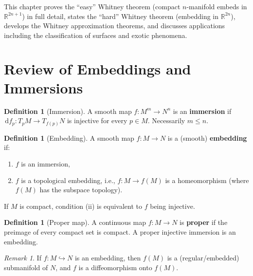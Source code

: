 \documentclass[12pt,a4paper,openany]{book}
\theoremstyle{definition}
\newtheorem{definition}[theorem]{Definition}
\theoremstyle{remark}
\newtheorem{remark}[theorem]{Remark}
\newcommand{\R}{\mathbb{R}}
\newcommand{\dd}{\,\mathrm{d}}
\begin{document}
This chapter proves the ``easy'' Whitney
theorem (compact $n$-manifold embeds in $\R^{2n+1}$) in full detail,
states the ``hard'' Whitney theorem (embedding in $\R^{2n}$),
develops the Whitney approximation theorems, and discusses applications
including the classification of surfaces and exotic phenomena.

\section{Review of Embeddings and Immersions}\label{sec:embed-review}

\begin{definition}[Immersion]\label{def:immersion-review}
A smooth map $f\colon M^m \to N^n$ is an \textbf{immersion} if
$\dd f_p\colon T_pM \to T_{f(p)}N$ is injective for every $p \in M$.
Necessarily $m \le n$.
\end{definition}

\begin{definition}[Embedding]\label{def:embedding-review}
A smooth map $f\colon M \to N$ is a (smooth) \textbf{embedding} if:
\begin{enumerate}[label=(\roman*)]
  \item $f$ is an immersion,
  \item $f$ is a topological embedding, i.e., $f\colon M \to f(M)$
    is a homeomorphism (where $f(M)$ has the subspace topology).
\end{enumerate}
If $M$ is compact, condition (ii) is equivalent to $f$ being injective.
\end{definition}

\begin{definition}[Proper map]\label{def:proper-review}
A continuous map $f\colon M \to N$ is \textbf{proper} if the preimage
of every compact set is compact. A proper injective immersion is an embedding.
\end{definition}

\begin{remark}\label{rem:embed-submanifold}
If $f\colon M \hookrightarrow N$ is an embedding, then $f(M)$ is a
(regular/embedded) submanifold of $N$, and $f$ is a diffeomorphism
onto $f(M)$.
\end{remark}
\end{document}
